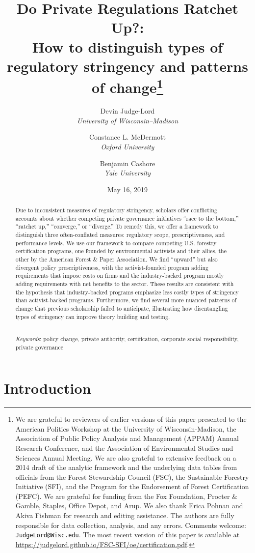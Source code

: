 \documentclass[
      12pt,
            Review ]{article}
\title{Do Private Regulations Ratchet Up?: 
           \\ How to distinguish types of regulatory stringency and patterns of change\thanks{We are grateful to reviewers of earlier versions of this paper presented
to the American Politics Workshop at the University of
Wisconsin-Madison, the Association of Public Policy Analysis and
Management (APPAM) Annual Research Conference, and the Association of
Environmental Studies and Sciences Annual Meeting. We are also grateful
to extensive feedback on a 2014 draft of the analytic framework and the
underlying data tables from officials from the Forest Stewardship
Council (FSC), the Sustainable Forestry Initiative (SFI), and the
Program for the Endorsement of Forest Certification (PEFC). We are
grateful for funding from the Fox Foundation, Procter \& Gamble,
Staples, Office Depot, and Arup. We also thank Erica Pohnan and Akiva
Fishman for research and editing assistance. The authors are fully
responsible for data collection, analysis, and any errors. Comments
welcome:
\href{mailto:JudgeLord@Wisc.edu}{\nolinkurl{JudgeLord@Wisc.edu}}. The
most recent version of this paper is available at
\url{https://judgelord.github.io/FSC-SFI/oe/certification.pdf}.}}
\author{ %
            Devin Judge-Lord  \\ \emph{University of Wisconsin--Madison} 
             \and 
            Constance L. McDermott  \\ \emph{Oxford University} 
             \and 
            Benjamin Cashore  \\ \emph{Yale University} 
            }
\date{May 16, 2019}
\begin{document}
 


  \maketitle




  \begin{abstract}
    \noindent Due to inconsistent measures of regulatory stringency, scholars offer
conflicting accounts about whether competing private governance
initiatives ``race to the bottom,'' ``ratchet up,'' ``converge,'' or
``diverge.'' To remedy this, we offer a framework to distinguish three
often-conflated measures: regulatory scope, prescriptiveness, and
performance levels. We use our framework to compare competing U.S.
forestry certification programs, one founded by environmental activists
and their allies, the other by the American Forest \& Paper Association.
We find ``upward'' but also divergent policy prescriptiveness, with the
activist-founded program adding requirements that impose costs on firms
and the industry-backed program mostly adding requirements with net
benefits to the sector. These results are consistent with the hypothesis
that industry-backed programs emphasize less costly types of stringency
than activist-backed programs. Furthermore, we find several more nuanced
patterns of change that previous scholarship failed to anticipate,
illustrating how disentangling types of stringency can improve theory
building and testing. 

          \hfill \\ 
      \noindent \emph{Keywords}: policy change, private authority, certification, corporate social
responsibility, private governance 
    
  \end{abstract}










\noindent 
      \doublespacing 
    \newpage

\section{Introduction}\label{introduction}
\end{document}
